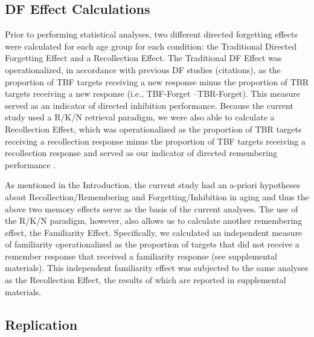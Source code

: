 \documentclass[man]{apa6}
\begin{document}
\subsection*{DF Effect Calculations}

Prior to performing statistical analyses, two different directed forgetting effects were calculated for each age group for each condition: the Traditional Directed Forgetting Effect and a Recollection Effect. The Traditional DF Effect was operationalized, in accordance with previous DF studies (citations), as the proportion of TBF targets receiving a new response minus the proportion of TBR targets receiving a new response (i.e., TBF-Forget –TBR-Forget). This measure served as an indicator of directed inhibition performance. Because the current study used a R/K/N retrieval paradigm, we were also able to calculate a Recollection Effect, which was operationalized as the proportion of TBR targets receiving a recollection response minus the proportion of TBF targets receiving a recollection response and served as our indicator of directed remembering performance \parencite{rizio.dennis2014plos}.

As mentioned in the Introduction, the current study had an a-priori hypotheses about Recollection/Remembering and Forgetting/Inhibition in aging and thus the above two memory effects serve as the basis of the current analyses. The use of the R/K/N paradigm, however, also allows us to calculate another remembering effect, the Familiarity Effect. Specifically, we calculated an independent measure of familiarity operationalized as the proportion of targets that did not receive a remember response that received a familiarity response \parencite{yonelinas.jacoby1995remknow,jacoby.yonelinas.jennings1997} (see supplemental materials). This independent familiarity effect was subjected to the same analyses as the Recollection Effect, the results of which are reported in supplemental materials.

\subsection*{Replication}
\end{document}
